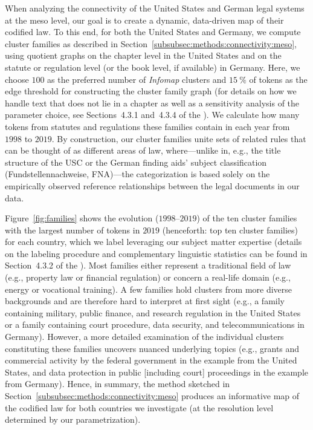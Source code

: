 When analyzing the connectivity of the United States and German legal systems at the meso level, our goal is to create a dynamic, data-driven map of their codified law.
To this end, for both the United States and Germany, we compute cluster families as described in Section~\ref{subsubsec:methods:connectivity:meso}, 
using quotient graphs on the chapter level in the United States and on the statute or regulation level (or the book level, if available) in Germany. 
Here, we choose $100$ as the preferred number of \emph{Infomap} clusters and $15~\%$ of tokens as the edge threshold for constructing the cluster family graph (for details on how we handle text that does not lie in a chapter as well as a sensitivity analysis of the parameter choice, see Sections~4.3.1 and~4.3.4 of the \thesi). 
We calculate how many tokens from statutes and regulations these families contain in each year from $1998$ to $2019$.
By construction, our cluster families unite sets of related rules that can be thought of as different areas of law, where---unlike in, e.g., the title structure of the USC or the German finding aids' subject classification (Fundstellennachweise, FNA)---the categorization is based solely on the empirically observed reference relationships between the legal documents in our data.

Figure~\ref{fig:families} shows the evolution ($1998$--$2019$) of the ten cluster families with the largest number of tokens in $2019$ (henceforth: top ten cluster families) for each country, which we label leveraging our subject matter expertise (details on the labeling procedure and complementary linguistic statistics can be found in Section~4.3.2 of the \thesi).
Most families either represent a traditional field of law (e.g., property law or financial regulation) or concern a real-life domain (e.g., energy or vocational training).
A few families hold clusters from more diverse backgrounds and are therefore hard to interpret at first sight (e.g., a family containing military, public finance, and research regulation in the United States or a family containing court procedure, data security, and telecommunications in Germany).
However, a more detailed examination of the individual clusters constituting these families uncovers nuanced underlying topics (e.g., grants and commercial activity by the federal government in the example from the United States, and data protection in public [including court] proceedings in the example from Germany).
Hence, in summary, the method sketched in Section~\ref{subsubsec:methods:connectivity:meso} produces an informative map of the codified law for both countries we investigate (at the resolution level determined by our parametrization).

